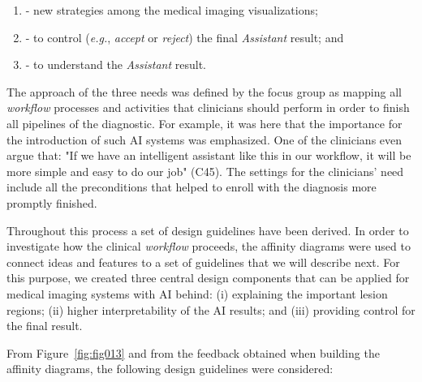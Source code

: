 \hfill

\begin{enumerate}[label=\alph*]
\item - new strategies among the medical imaging visualizations;
\item - to control ({\it e.g.}, {\it accept} or {\it reject}) the final {\it Assistant} result; and
\item - to understand the {\it Assistant} result.
\end{enumerate}

\hfill

The approach of the three needs was defined by the focus group as mapping all {\it workflow} processes and activities that clinicians should perform in order to finish all pipelines of the diagnostic.
For example, it was here that the importance for the introduction of such AI systems was emphasized.
One of the clinicians even argue that: "If we have an intelligent assistant like this in our workflow, it will be more simple and easy to do our job" (C45).
The settings for the clinicians' need include all the preconditions that helped to enroll with the diagnosis more promptly finished.

Throughout this process a set of design guidelines have been derived.
In order to investigate how the clinical {\it workflow} proceeds, the affinity diagrams were used to connect ideas and features to a set of guidelines that we will describe next.
For this purpose, we created three central design components that can be applied for medical imaging systems with AI behind: (i) explaining the important lesion regions; (ii) higher interpretability of the AI results; and (iii) providing control for the final result.

\clearpage

\noindent
From Figure~\ref{fig:fig013} and from the feedback obtained when building the affinity diagrams, the following design guidelines were considered:

\hfill

